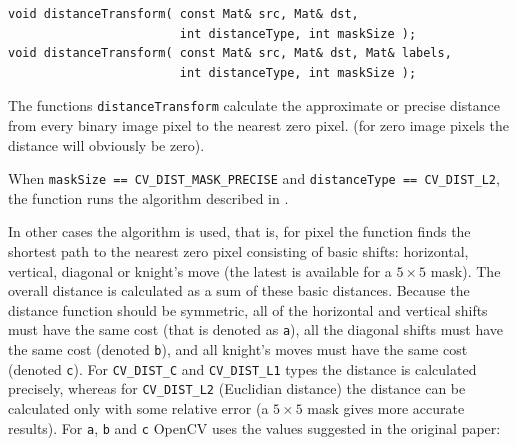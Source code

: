 \begin{lstlisting}
void distanceTransform( const Mat& src, Mat& dst,
                        int distanceType, int maskSize );
void distanceTransform( const Mat& src, Mat& dst, Mat& labels,
                        int distanceType, int maskSize );
\end{lstlisting}
\begin{description}
\end{description}

The functions \texttt{distanceTransform} calculate the approximate or precise
distance from every binary image pixel to the nearest zero pixel.
(for zero image pixels the distance will obviously be zero).

When \texttt{maskSize == CV\_DIST\_MASK\_PRECISE} and \texttt{distanceType == CV\_DIST\_L2}, the function runs the algorithm described in \cite{Felzenszwalb04}.

In other cases the algorithm \cite{Borgefors86} is used, that is,
for pixel the function finds the shortest path to the nearest zero pixel
consisting of basic shifts: horizontal,
vertical, diagonal or knight's move (the latest is available for a
$5\times 5$ mask). The overall distance is calculated as a sum of these
basic distances. Because the distance function should be symmetric,
all of the horizontal and vertical shifts must have the same cost (that
is denoted as \texttt{a}), all the diagonal shifts must have the
same cost (denoted \texttt{b}), and all knight's moves must have
the same cost (denoted \texttt{c}). For \texttt{CV\_DIST\_C} and
\texttt{CV\_DIST\_L1} types the distance is calculated precisely,
whereas for \texttt{CV\_DIST\_L2} (Euclidian distance) the distance
can be calculated only with some relative error (a $5\times 5$ mask
gives more accurate results). For \texttt{a}, \texttt{b} and \texttt{c}
OpenCV uses the values suggested in the original paper:


